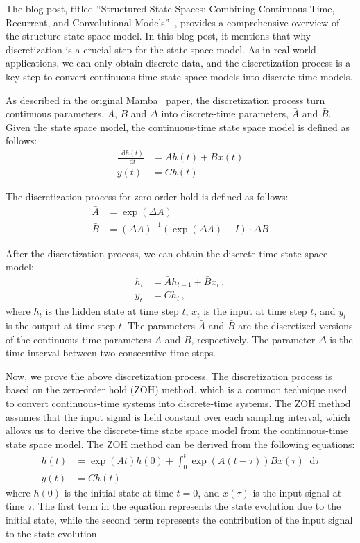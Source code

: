 \documentclass[a4paper]{article}
\newcommand*{\dif}{\mathop{}\!\mathrm{d}}
\begin{document}
The blog post, titled ``Structured State Spaces: Combining Continuous-Time, Recurrent, and Convolutional Models''~\cite{gu2022structuredstatespaces}, provides a comprehensive overview of the structure state space model. In this blog post, it mentions that why discretization is a crucial step for the state space model. As in real world applications, we can only obtain discrete data, and the discretization process is a key step to convert continuous-time state space models into discrete-time models.

As described in the original Mamba~\cite{gu2023mamba} paper, the discretization process turn continuous parameters, $A$, $B$ and $\Delta$ into discrete-time parameters, $\bar{A}$ and $\bar{B}$. Given the state space model, the continuous-time state space model is defined as follows:
\begin{align}
    \frac{\dif h(t)}{\dif t} &= Ah(t) + Bx(t) \\
    y(t) &= Ch(t)
\end{align}

The discretization process for zero-order hold is defined as follows:
\begin{align}
    \bar{A} &= \exp(\Delta A) \\
    \bar{B} &= (\Delta A)^{-1}(\exp(\Delta A) - I) \cdot \Delta B
\end{align}

After the discretization process, we can obtain the discrete-time state space model:
\begin{align}
    h_{t} &= \bar{A}h_{t-1} + \bar{B}x_t \, , \\
    y_t &= Ch_t \, ,
\end{align}
where $h_t$ is the hidden state at time step $t$, $x_t$ is the input at time step $t$, and $y_t$ is the output at time step $t$. The parameters $\bar{A}$ and $\bar{B}$ are the discretized versions of the continuous-time parameters $A$ and $B$, respectively. The parameter $\Delta$ is the time interval between two consecutive time steps.

Now, we prove the above discretization process. The discretization process is based on the zero-order hold (ZOH) method, which is a common technique used to convert continuous-time systems into discrete-time systems. The ZOH method assumes that the input signal is held constant over each sampling interval, which allows us to derive the discrete-time state space model from the continuous-time state space model.
The ZOH method can be derived from the following equations:
\begin{align}
    h(t) &= \exp(At)h(0) + \int_0^t \exp(A(t-\tau))B x(\tau) \dif \tau \\
    y(t) &= Ch(t)
\end{align}
where $h(0)$ is the initial state at time $t=0$, and $x(\tau)$ is the input signal at time $\tau$. The first term in the equation represents the state evolution due to the initial state, while the second term represents the contribution of the input signal to the state evolution.
\end{document}
